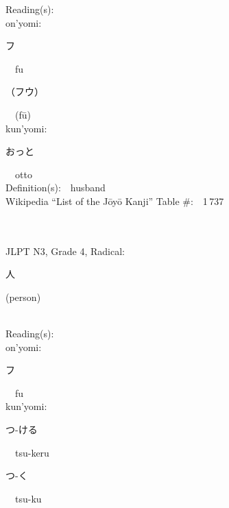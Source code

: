 \begin{multicols}{2}
Reading(s):\ \ \\
{\hspace*{1em}}on'yomi:\ \ \\
{\hspace*{2em}}{\begin{CJK}{UTF8}{min} フ \end{CJK}}\ \ fu\ \ \\
{\hspace*{2em}}{\begin{CJK}{UTF8}{min} （フウ） \end{CJK}}\ \ (f\=u)\ \ \\
{\hspace*{1em}}kun'yomi:\ \ \\
{\hspace*{2em}}{\begin{CJK}{UTF8}{min} おっと \end{CJK}}\ \ otto\ \ \\
Definition(s):\ \ husband \\
Wikipedia ``List of the J\=oy\=o Kanji'' Table \#:\ \ 1\,737 \\
\ \ \\
{\fontsize{34pt}{40pt}  }\ \ \\  %
{JLPT N3, Grade 4, Radical:\ \ {\begin{CJK}{UTF8}{min} 人 \end{CJK}} (person) } \\
Reading(s):\ \ \\
{\hspace*{1em}}on'yomi:\ \ \\
{\hspace*{2em}}{\begin{CJK}{UTF8}{min} フ \end{CJK}}\ \ fu\ \ \\
{\hspace*{1em}}kun'yomi:\ \ \\
{\hspace*{2em}}{\begin{CJK}{UTF8}{min} つ-ける \end{CJK}}\ \ tsu-keru\ \ \\
{\hspace*{2em}}{\begin{CJK}{UTF8}{min} つ-く \end{CJK}}\ \ tsu-ku\ \ \\

\end{multicols}
